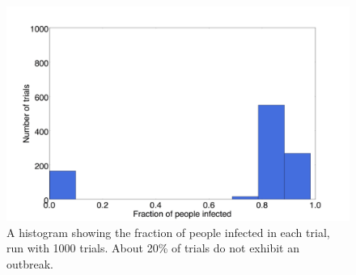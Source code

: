 \begin{figure}
  \centering
  \includegraphics[width=.6\textwidth]{Histogram-sabd}
  \caption{A histogram showing the fraction of people infected in each trial, run with 1000 trials. About 20\% of trials do not exhibit an outbreak.}
  \label{fig:hist-sabd}
\end{figure}